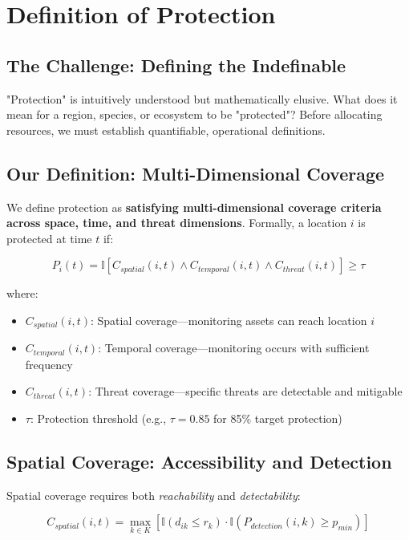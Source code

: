 \section{Definition of Protection}

\subsection{The Challenge: Defining the Indefinable}

"Protection" is intuitively understood but mathematically elusive. What does it mean for a region, species, or ecosystem to be "protected"? Before allocating resources, we must establish quantifiable, operational definitions.

\subsection{Our Definition: Multi-Dimensional Coverage}

We define protection as \textbf{satisfying multi-dimensional coverage criteria across space, time, and threat dimensions}. Formally, a location $i$ is protected at time $t$ if:

\begin{equation}
P_i(t) = \mathbb{I}\left[C_{spatial}(i,t) \land C_{temporal}(i,t) \land C_{threat}(i,t)\right] \geq \tau
\label{eq:protection_def}
\end{equation}

where:
\begin{itemize}
\item $C_{spatial}(i,t)$: Spatial coverage—monitoring assets can reach location $i$
\item $C_{temporal}(i,t)$: Temporal coverage—monitoring occurs with sufficient frequency
\item $C_{threat}(i,t)$: Threat coverage—specific threats are detectable and mitigable
\item $\tau$: Protection threshold (e.g., $\tau = 0.85$ for 85\% target protection)
\end{itemize}

\subsection{Spatial Coverage: Accessibility and Detection}

Spatial coverage requires both \textit{reachability} and \textit{detectability}:

\begin{equation}
C_{spatial}(i,t) = \max_{k \in K}\left[\mathbb{I}(d_{ik} \leq r_k) \cdot \mathbb{I}(P_{detection}(i,k) \geq p_{min})\right]
\label{eq:spatial_coverage}
\end{equation}

